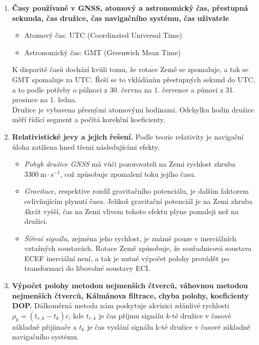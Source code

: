 \documentclass[11pt,a4paper]{article}
\begin{document}
\begin{enumerate}
    \item \textbf{Časy používané v GNSS, atomový a astronomický čas, přestupná sekunda, čas družice, čas navigačního systému, čas uživatele}
    \begin{itemize}
        \item Atomový čas: UTC (Coordinated Universal Time)
        \item Astronomický čas: GMT (Greenwich Mean Time)
    \end{itemize}
    K disparitě časů dochází kvůli tomu, že rotace Země se zpomaluje, a tak se GMT spomaluje za UTC. Řeší se to vkládáním přestupných sekund do UTC, a to podle potřeby o půlnoci z 30. června na 1. července a půnoci z 31. prosince na 1. ledna.\\
    Družice je vybavena přesnými atomovými hodinami. Odchylku hodin družice měří řídící segment a počítá korekční koeficienty.
    
    \item \textbf{Relativistické jevy a jejich řešení.} Podle teorie relativity je navigační úloha zatížena hned třemi následujícími efekty.
    \begin{itemize}
        \item \emph{Pohyb družice GNSS} má vůči pozorovateli na Zemi rychlost zhruba $3300\ \mathrm m \cdot \mathrm s^{-1}$, což způsobuje zpomalení toku jejího času.
        \item \emph{Gravitace,} respektive rozdíl gravitačního potenciálu, je dalším faktorem ovlivňujícím plynutí času. Jelikož gravitační potenciál je na Zemi zhruba 4krát vyšší, čas na Zemi vlivem tohoto efektu plyne pomaleji než na družici.
        \item \emph{Šíření signálu,} zejména jeho rychlost, je známé pouze v inerciálních vztažných soustavách. Rotace Země způsobuje, že souřadnicová soustava ECEF inerciální není, a tak je nutné výpočet polohy provádět po transformaci do libovolné soustavy ECI.
    \end{itemize}
    
    \item \textbf{Výpočet polohy metodou nejmenších čtverců, váhovnou metodou nejmenších čtverců, Kálmánova filtrace, chyba polohy, koeficienty DOP.} Dálkoměrná metoda nám poskytuje akvizici zdánlivé rychlosti $\rho_k = (t_{r,k}-t_k)c$, kde $t_{r,k}$ je čas příjmu signálu $k$-té družice v časové základně přijímače a $t_k$ je čas vyslání signálu k-té družice v časové základně navigačního systému.
    

\end{enumerate}
\end{document}
